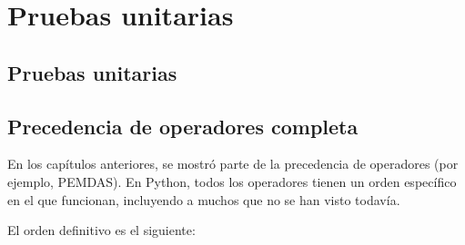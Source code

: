 \chapter{Pruebas unitarias}

\section{Pruebas unitarias}


\section{Precedencia de operadores completa}

En los capítulos anteriores, se mostró parte de la precedencia de operadores (por ejemplo, PEMDAS). En Python, todos los operadores tienen un orden específico en el que funcionan, incluyendo a muchos que no se han visto todavía.\smallskip

El orden definitivo es el siguiente:

